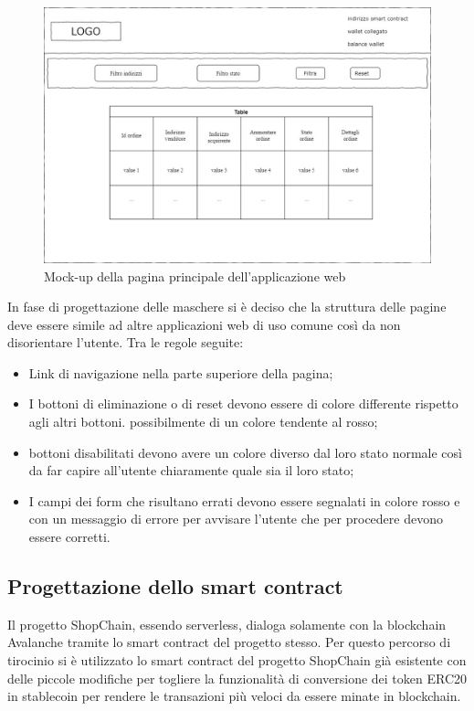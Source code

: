 \begin{figure}[!h] 
    \centering 
    \includegraphics[width=0.8\columnwidth]{immagini/progettazione/homePage.jpg} 
    \caption{Mock-up della pagina principale dell'applicazione web}
\end{figure}

In fase di progettazione delle maschere si è deciso che la struttura delle pagine deve essere simile ad altre applicazioni web di uso comune così da non disorientare l’utente. Tra le regole seguite:
\begin{itemize}
    \item Link di navigazione nella parte superiore della pagina;
    \item I bottoni di eliminazione o di reset devono essere di colore differente rispetto agli altri bottoni. possibilmente di un colore tendente al rosso;
    \item bottoni disabilitati devono avere un colore diverso dal loro stato normale così da far capire all’utente chiaramente quale sia il loro stato;
    \item I campi dei form che risultano errati devono essere segnalati in colore rosso e con un messaggio di errore per avvisare l’utente che per procedere devono essere corretti.
\end{itemize}


\subsection{Progettazione dello smart contract}

Il progetto ShopChain, essendo serverless, dialoga solamente con la blockchain Avalanche tramite lo smart contract del progetto stesso. Per questo percorso di tirocinio si è utilizzato lo smart contract del progetto ShopChain già esistente con delle piccole modifiche per togliere la funzionalità di conversione dei token ERC20 in stablecoin per rendere le transazioni più veloci da essere minate in blockchain.

